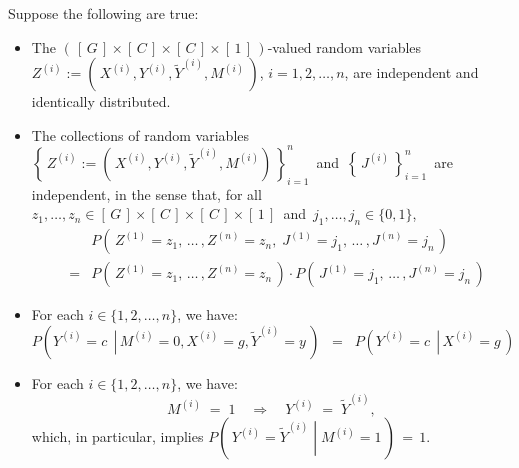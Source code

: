 \vskip 0.3cm
\noindent
Suppose the following are true:
\begin{itemize}
\item
	The $\left(\,\left[\,G\,\right] \times \left[\,C\,\right] \times \left[\,C\,\right] \times \left[\,1\,\right]\,\right)$-valued
	random variables
	$Z^{(i)} := \left(\,X^{(i)},Y^{(i)},\widetilde{Y}^{(i)},M^{(i)}\,\right)$,
	$i = 1, 2, \ldots, n$, are independent and identically distributed.
\item
	The collections of random variables
	\,$\left\{\,Z^{(i)} := \left(\,X^{(i)},Y^{(i)},\widetilde{Y}^{(i)},M^{(i)}\right)\,\right\}_{i=1}^{n}$\,
	and
	\,$\left\{\,J^{(i)}\,\right\}_{i=1}^{n}$\,
	are independent, in the sense that, for all
	\,$z_{1}, \ldots, z_{n} \in \left[\,G\,\right] \times \left[\,C\,\right] \times \left[\,C\,\right] \times \left[\,1\,\right]$\,
	and
	\,$j_{1}, \ldots, j_{n} \in \{0,1\}$,\,
	\begin{eqnarray*}
	&&
		P\!\left(\,Z^{(1)}=z_{1},\,\ldots\,,Z^{(n)}=z_{n},\;J^{(1)}=j_{1},\,\ldots\,,J^{(n)}=j_{n}\,\right)
	\\
	& = &
		P\!\left(\,Z^{(1)}=z_{1},\,\ldots\,,Z^{(n)}=z_{n}\,\right)
		\cdot
		P\!\left(\,J^{(1)}=j_{1},\,\ldots\,,J^{(n)}=j_{n}\,\right)
	\end{eqnarray*}
\item
	For each $i\in\{1,2,\ldots,n\}$, we have:
	\begin{equation*}
	P\!\left(\left.Y^{(i)} = c\,\;\right\vert\,M^{(i)}=0,X^{(i)}=g,\widetilde{Y}^{(i)}=y\,\right)
	\;\; = \;\;
	P\!\left(\left.Y^{(i)} = c\,\;\right\vert\,X^{(i)}=g\,\right)
	\end{equation*}
\item
	For each $i\in\{1,2,\ldots,n\}$, we have:
	\begin{equation*}
	M^{(i)} \; = \; 1
	\quad\Longrightarrow\quad
	Y^{(i)} \; = \; \widetilde{Y}^{(i)},
	\end{equation*}
	which, in particular, implies $P\!\left(\,\left.Y^{(i)} = \widetilde{Y}^{(i)}\;\right\vert\;M^{(i)}=1\,\right)\,=\,1$.
\end{itemize}

